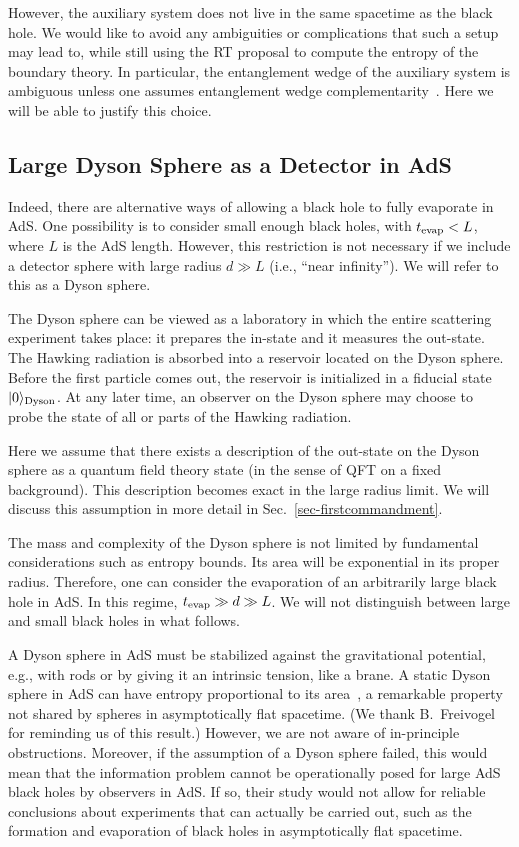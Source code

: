 \documentclass[12pt,letterpaper]{article}
\begin{document}
However, the auxiliary system does not live in the same spacetime as the black hole. We would like to avoid any ambiguities or complications that such a setup may lead to, while still using the RT proposal to compute the entropy of the boundary theory. In particular, the entanglement wedge of the auxiliary system is ambiguous unless one assumes entanglement wedge complementarity~\cite{AEMM}. Here we will be able to justify this choice.

\subsection{Large Dyson Sphere as a Detector in AdS}
\label{sec-dysondetectors}

Indeed, there are alternative ways of allowing a black hole to fully evaporate in AdS. One possibility is to consider small enough black holes, with $t_{\rm evap}<L$, where $L$ is the AdS length. However, this restriction is not necessary if we include a detector sphere with large radius $d\gg L$ (i.e., ``near infinity''). We will refer to this as a Dyson sphere.

The Dyson sphere can be viewed as a laboratory in which the entire scattering experiment takes place: it prepares the in-state and it measures the out-state. The Hawking radiation is absorbed into a reservoir located on the Dyson sphere. Before the first particle comes out, the reservoir is initialized in a fiducial state $|0\rangle_{\rm Dyson}$.  At any later time, an observer on the Dyson sphere may choose to probe the state of all or parts of the Hawking radiation.

Here we assume that there exists a description of the out-state on the Dyson sphere as a quantum field theory state (in the sense of QFT on a fixed background). This description becomes exact in the large radius limit. We will discuss this assumption in more detail in Sec.~\ref{sec-firstcommandment}.

The mass and complexity of the Dyson sphere is not limited by fundamental considerations such as entropy bounds. Its area will be exponential in its proper radius. Therefore, one can consider the evaporation of an arbitrarily large black hole in AdS. In this regime, $t_{\rm evap}\gg d\gg L$. We will not distinguish between large and small black holes in what follows.

A Dyson sphere in AdS must be stabilized against the gravitational potential, e.g., with rods or by giving it an intrinsic tension, like a brane. A static Dyson sphere in AdS can have entropy proportional to its area~\cite{BouFre10a}, a remarkable property not shared by spheres in asymptotically flat spacetime. (We thank B.~Freivogel for reminding us of this result.) However, we are not aware of in-principle obstructions. Moreover, if the assumption of a Dyson sphere failed, this would mean that the information problem cannot be operationally posed for large AdS black holes by observers in AdS. If so, their study would not allow for reliable conclusions about experiments that can actually be carried out, such as the formation and evaporation of black holes in asymptotically flat spacetime.
\end{document}
